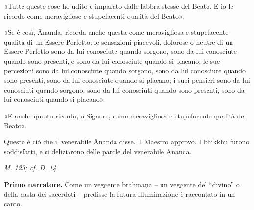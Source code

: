«Tutte queste cose ho udito e imparato dalle labbra stesse del Beato. E
io le ricordo come meravigliose e stupefacenti qualità del Beato».


«Se è così, Ānanda, ricorda anche questa come meravigliosa e
stupefacente qualità di un Essere Perfetto: le sensazioni piacevoli,
dolorose o neutre di un Essere Perfetto sono da lui conosciute quando
sorgono, sono da lui conosciute quando sono presenti, e sono da lui
conosciute quando si placano; le sue percezioni sono da lui conosciute
quando sorgono, sono da lui conosciute quando sono presenti, sono da lui
conosciute quando si placano; i suoi pensieri sono da lui conosciuti
quando sorgono, sono da lui conosciuti quando sono presenti, sono da lui
conosciuti quando si placano».


«E anche questo ricordo, o Signore, come meravigliosa e stupefacente
qualità del Beato».


Questo è ciò che il venerabile Ānanda disse. Il Maestro approvò. I
bhikkhu furono soddisfatti, e si deliziarono delle parole del venerabile
Ānanda.


\emph{M. 123; cf. D. 14}


\textbf{Primo narratore.} Come un veggente brāhmaṇa – un veggente del “divino” o
della casta dei sacerdoti – predisse la futura Illuminazione è
raccontato in un canto.


